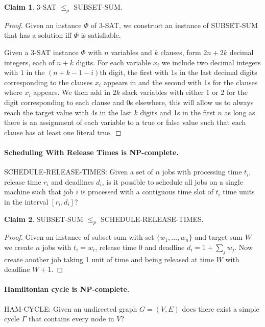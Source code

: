 \documentclass[11pt,a4paper]{article}
\theoremstyle{definition}
\newtheorem{claim}{Claim}
\begin{document}
\begin{claim}
3-SAT $\le_p$ SUBSET-SUM.
\end{claim}
\begin{proof}
Given an instance $\Phi$ of 3-SAT, we construct an instance of SUBSET-SUM that has a solution iff $\Phi$ is satisfiable.

Given a 3-SAT instance $\Phi$ with $n$ variables and $k$ clauses, form $2n + 2k$ decimal integers, each of $n+k$ digits.
For each variable $x_i$ we include two decimal integers with $1$ in the $(n+k-1-i)$th digit, the first with 1s in the last decimal digits corresponding to the clauses $x_i$ appears in and the second with 1s for the clauses where $\overline{x_i}$ appears.
We then add in $2k$ slack variables with either 1 or 2 for the digit corresponding to each clause and 0s elsewhere, this will allow us to always reach the target value with 4s in the last $k$ digits and 1s in the first $n$ as long as there is an assignment of each variable to a true or false value such that each clause has at least one literal true.
\end{proof}

\paragraph{Scheduling With Release Times is NP-complete.}
SCHEDULE-RELEASE-TIMES: Given a set of $n$ jobs with processing time $t_i$, release time $r_i$ and deadlines $d_i$, is it possible to schedule all jobs on a single machine such that job $i$ is processed with a contiguous time slot of $t_i$ time units in the interval $[r_i, d_i]$?

\begin{claim}
SUBSET-SUM $\le_p$ SCHEDULE-RELEASE-TIMES.
\end{claim}
\begin{proof}
Given an instance of subset sum with set $\{w_1,\ldots,w_n\}$ and target sum $W$ we create $n$ jobs with $t_i = w_i$, release time $0$ and deadline $d_i = 1 + \sum_{j} w_j$.
Now create another job taking 1 unit of time and being released at time $W$ with deadline $W +1$.
\end{proof}

\paragraph{Hamiltonian cycle is NP-complete.}
HAM-CYCLE: Given an undirected graph $G = (V,E)$ does there exist a simple cycle $\Gamma$ that contains every node in $V$?
\end{document}
